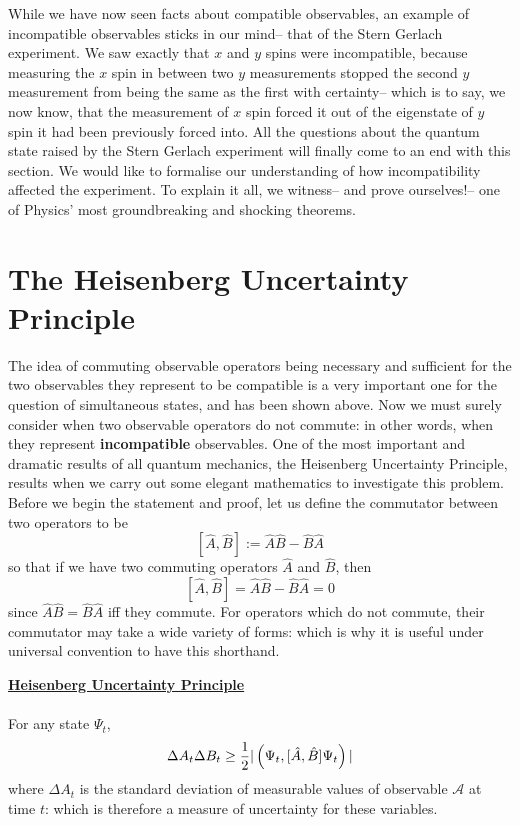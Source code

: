 While we have now seen facts about compatible observables, an example of incompatible observables sticks in our mind-- that of the Stern Gerlach experiment. We saw exactly that $x$ and $y$ spins were incompatible, because measuring the $x$ spin in between two $y$ measurements stopped the second $y$ measurement from being the same as the first with certainty-- which is to say, we now know, that the measurement of $x$ spin forced it out of the eigenstate of $y$ spin it had been previously forced into. All the questions about the quantum state raised by the Stern Gerlach experiment will finally come to an end with this section. We would like to formalise our understanding of how incompatibility affected the experiment. To explain it all, we witness-- and prove ourselves!-- one of Physics' most groundbreaking and shocking theorems.
\section{The Heisenberg Uncertainty Principle}
The idea of commuting observable operators being necessary and sufficient for the two observables they represent to be compatible is a very important one for the question of simultaneous states, and has been shown above. Now we must surely consider when two observable operators do not commute: in other words, when they represent \textbf{incompatible} observables. One of the most important and dramatic results of all quantum mechanics, the Heisenberg Uncertainty Principle, results when we carry out some elegant mathematics to investigate this problem. Before we begin the statement and proof, let us define the commutator between two operators to be 
$$
[\hat{A},\hat{B}]:=\hat{A}\hat{B}-\hat{B}\hat{A}
$$
so that if we have two commuting operators $\hat{A}$ and $\hat{B}$, then 
$$
[\hat{A},\hat{B}]=\hat{A}\hat{B}-\hat{B}\hat{A}=0
$$
since $\hat{A}\hat{B}=\hat{B}\hat{A}$ iff they commute. For operators which do not commute, their commutator may take a wide variety of forms: which is why it is useful under universal convention to have this shorthand.
\begin{tcolorbox}
\textbf{\underline{Heisenberg Uncertainty Principle}}\\\\
For any state $\Psi_{t}$,
$$
\Delta A_{t}\Delta B_{t}\geq\frac{1}{2}|\left(\Psi_{t},[\hat{A},\hat{B}]\Psi_{t}\right)|
$$
where $\Delta A_{t}$ is the standard deviation of measurable values of observable $\mathcal{A}$ at time $t$: which is therefore a measure of uncertainty for these variables.
\end{tcolorbox}

